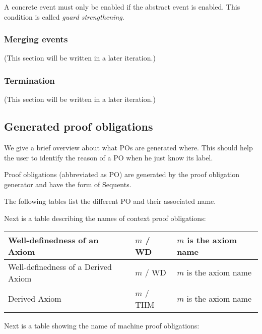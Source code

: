A concrete event must only be enabled if the abstract event is enabled.
This condition is called \emph{guard strengthening}.


\subsubsection{Merging events}
\label{merging_events}
(This section will be written in a later iteration.)

\subsubsection{Termination}
\label{termination}
(This section will be written in a later iteration.)

  
\subsection{Generated proof obligations}

We give a brief overview about what POs are generated where. This should help the user to identify the reason of a PO when he just know its label.


Proof obligations (abbreviated as PO) are generated by the proof obligation generator and have the form of Sequents. 

The following tables list the different PO and their associated name.

Next is a table describing the names of context proof obligations: 

\begin{center}
    \begin{tabular}{| p{6cm} | p{3cm} | p{5cm} |}
    \hline
	Well-definedness of an Axiom & $m$ / WD & $m$ is the axiom name\\ \hline
	Well-definedness of a Derived Axiom & $m$  / WD & $m$ is the axiom name \\ \hline
	Derived Axiom & $m$  / THM & $m$ is the axiom name \\ \hline
    \end{tabular}
\end{center}

Next is a table showing the name of machine proof obligations:

